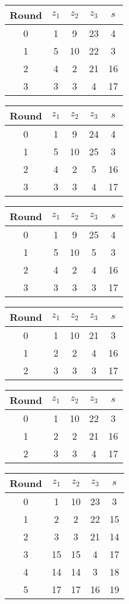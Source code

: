 \begin{multicols}{2}
\begin{tabular}{c | c | c | c | c }
Round & $z_1$ & $z_2$ & $z_3$ & $s$ \\
\hline
0 & 1 & 9 & 23 & 4 \\
1 & 5 & 10 & 22 & 3 \\
2 & 4 & 2 & 21 & 16 \\
3 & 3 & 3 & 4 & 17
\end{tabular}


\begin{tabular}{c | c | c | c | c }
Round & $z_1$ & $z_2$ & $z_3$ & $s$ \\
\hline
0 & 1 & 9 & 24 & 4 \\
1 & 5 & 10 & 25 & 3 \\
2 & 4 & 2 & 5 & 16 \\
3 & 3 & 3 & 4 & 17
\end{tabular}


\begin{tabular}{c | c | c | c | c }
Round & $z_1$ & $z_2$ & $z_3$ & $s$ \\
\hline
0 & 1 & 9 & 25 & 4 \\
1 & 5 & 10 & 5 & 3 \\
2 & 4 & 2 & 4 & 16 \\
3 & 3 & 3 & 3 & 17
\end{tabular}


\begin{tabular}{c | c | c | c | c }
Round & $z_1$ & $z_2$ & $z_3$ & $s$ \\
\hline
0 & 1 & 10 & 21 & 3 \\
1 & 2 & 2 & 4 & 16 \\
2 & 3 & 3 & 3 & 17
\end{tabular}


\begin{tabular}{c | c | c | c | c }
Round & $z_1$ & $z_2$ & $z_3$ & $s$ \\
\hline
0 & 1 & 10 & 22 & 3 \\
1 & 2 & 2 & 21 & 16 \\
2 & 3 & 3 & 4 & 17
\end{tabular}


\begin{tabular}{c | c | c | c | c }
Round & $z_1$ & $z_2$ & $z_3$ & $s$ \\
\hline
0 & 1 & 10 & 23 & 3 \\
1 & 2 & 2 & 22 & 15 \\
2 & 3 & 3 & 21 & 14 \\
3 & 15 & 15 & 4 & 17 \\
4 & 14 & 14 & 3 & 18 \\
5 & 17 & 17 & 16 & 19
\end{tabular}



\end{multicols}
